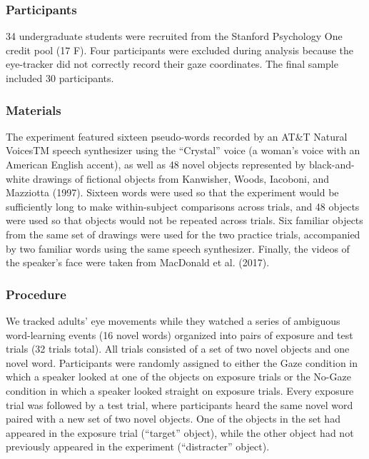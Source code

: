 \documentclass[man,floatsintext]{apa6}
\begin{document}
\subsubsection{Participants}\label{participants-1}

34 undergraduate students were recruited from the Stanford Psychology
One credit pool (17 F). Four participants were excluded during analysis
because the eye-tracker did not correctly record their gaze coordinates.
The final sample included 30 participants.

\subsubsection{Materials}\label{materials-1}

The experiment featured sixteen pseudo-words recorded by an AT\&T
Natural VoicesTM speech synthesizer using the \enquote{Crystal} voice (a
woman's voice with an American English accent), as well as 48 novel
objects represented by black-and-white drawings of fictional objects
from Kanwisher, Woods, Iacoboni, and Mazziotta (1997). Sixteen words
were used so that the experiment would be sufficiently long to make
within-subject comparisons across trials, and 48 objects were used so
that objects would not be repeated across trials. Six familiar objects
from the same set of drawings were used for the two practice trials,
accompanied by two familiar words using the same speech synthesizer.
Finally, the videos of the speaker's face were taken from MacDonald et
al. (2017).

\subsubsection{Procedure}\label{procedure-1}

We tracked adults' eye movements while they watched a series of
ambiguous word-learning events (16 novel words) organized into pairs of
exposure and test trials (32 trials total). All trials consisted of a
set of two novel objects and one novel word. Participants were randomly
assigned to either the Gaze condition in which a speaker looked at one
of the objects on exposure trials or the No-Gaze condition in which a
speaker looked straight on exposure trials. Every exposure trial was
followed by a test trial, where participants heard the same novel word
paired with a new set of two novel objects. One of the objects in the
set had appeared in the exposure trial (\enquote{target} object), while
the other object had not previously appeared in the experiment
(\enquote{distracter} object).
\end{document}
